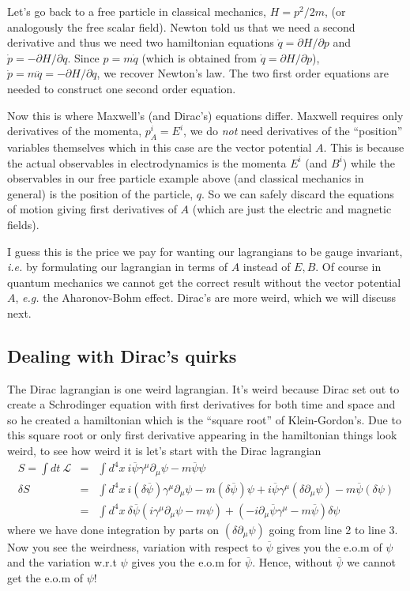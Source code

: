 \documentclass[aps,preprint,preprintnumbers,nofootinbib,showpacs,prd]{revtex4-1}
\newcommand{\ie}{{\it i.e.} }
\newcommand{\eg}{{\it e.g.} }
\newcommand{\nbea}{\begin{eqnarray*}}
\newcommand{\neea}{\end{eqnarray*}}
\begin{document}
Let's go back to a free particle in classical mechanics, $H = p^2/2m$, (or analogously the free scalar field). Newton told us that we need a second derivative and thus we need two hamiltonian equations $\dot q = \partial H/\partial p$ and $\dot p = -\partial H/\partial q$. Since $p = m\dot q$ (which is obtained from $\dot q = \partial H/\partial p$), $\dot p = m\ddot q = -\partial H/\partial q$, we recover Newton's law. The two first order equations are needed to construct one second order equation.

Now this is where Maxwell's (and Dirac's) equations differ. Maxwell requires only derivatives of the momenta, $p^i_A = E^i$, we do {\it not} need derivatives of the ``position'' variables themselves which in this case are the vector potential $A$. This is because the actual observables in electrodynamics is the momenta $E^i$ (and $B^i$) while the observables in our free particle example above (and classical mechanics in general) is the position of the particle, $q$. So we can safely discard the equations of motion giving first derivatives of $A$ (which are just the electric and magnetic fields).

I guess this is the price we pay for wanting our lagrangians to be gauge invariant, \ie by formulating our lagrangian in terms of $A$ instead of $E, B$. Of course in quantum mechanics we cannot get the correct result without the vector potential $A$, \eg the Aharonov-Bohm effect. Dirac's are more weird, which we will discuss next.


\subsection{Dealing with Dirac's quirks}

\renewcommand{\theequation}{A.\arabic{equation}}  %
\setcounter{equation}{0}  %

The Dirac lagrangian is one weird lagrangian. It's weird because Dirac set out to create a Schrodinger equation with first derivatives for both time and space and so he created a hamiltonian which is the ``square root'' of Klein-Gordon's. Due to this square root or only first derivative appearing in the hamiltonian things look weird, to see how weird it is let's start with the Dirac lagrangian
%
\nbea
S = \int dt ~ \mathcal{L} & = & \int d^4x~i\overline \psi \gamma^\mu \partial_\mu \psi - m\overline \psi \psi \\
\delta S & = & \int d^4x~i (\delta \overline \psi) \gamma^\mu \partial_\mu \psi - m (\delta \overline \psi) \psi + i \overline \psi \gamma^\mu (\delta \partial_\mu \psi) - m\overline \psi (\delta \psi) \\
& = & \int d^4x~ \delta \overline \psi \left ( i \gamma^\mu \partial_\mu \psi - m \psi \right ) + \left ( -i \partial_\mu \overline \psi \gamma^\mu - m\overline \psi \right ) \delta \psi
\neea
%
where we have done integration by parts on $(\delta \partial_\mu \psi)$ going from line 2 to line 3. Now you see the weirdness, variation with respect to $\overline \psi$ gives you the e.o.m of $\psi$ and the variation w.r.t $\psi$ gives you the e.o.m for $\overline \psi$. Hence, without $\overline \psi$ we cannot get the e.o.m of $\psi$! 
\end{document}
